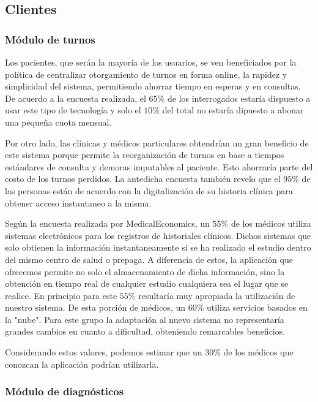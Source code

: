 \documentclass[a4paper,10pt]{article}
\begin{document}
\subsection{Clientes}

\subsubsection{Módulo de turnos}

Los pacientes, que serán la mayoría de los usuarios, se ven beneficiados por la política de centralizar otorgamiento de turnos en forma online, la rapidez y simplicidad del sistema, permitiendo ahorrar tiempo en esperas y en consultas. De acuerdo a la encuesta realizada, el $65\%$ de los interrogados estaría dispuesto a usar este tipo de tecnología y solo el $10\%$ del total no estaría dipuesto a abonar una pequeña cuota mensual. 

Por otro lado, las clínicas y médicos particulares obtendrían un gran beneficio de este sistema porque permite la reorganización de turnos en base a tiempos estándares de consulta y demoras imputables al paciente. Esto ahorraría parte del costo de los turnos perdidos. La antedicha encuesta también revelo que el $95\%$ de las personas están de acuerdo con la digitalización de su historia clínica para obtener acceso instantaneo a la misma.

Según la encuesta realizada por MedicalEconomics, un $55\%$ de los médicos utiliza sistemas electrónicos para los registros de historiales clínicos. Dichos sistemas que solo obtienen la información instantaneamente si se ha realizado el estudio dentro del mismo centro de salud o prepaga. A diferencia de estos, la aplicación que ofrecemos permite no solo el almacenamiento de dicha información, sino la obtención  en tiempo real de cualquier estudio cualquiera sea el lugar que se realice. En principio para este $55\%$ resultaría muy apropiada la utilización de nuestro sistema. De esta porción de médicos, un $60\%$ utiliza servicios basados en la "nube". Para este grupo la adaptación al nuevo sistema no representaría grandes cambios en cuanto a dificultad, obteniendo remarcables beneficios.

Considerando estos valores, podemos estimar que un $30\%$ de los médicos que conozcan la aplicación podrían utilizarla. 

\subsubsection{Módulo de diagnósticos}
\end{document}
